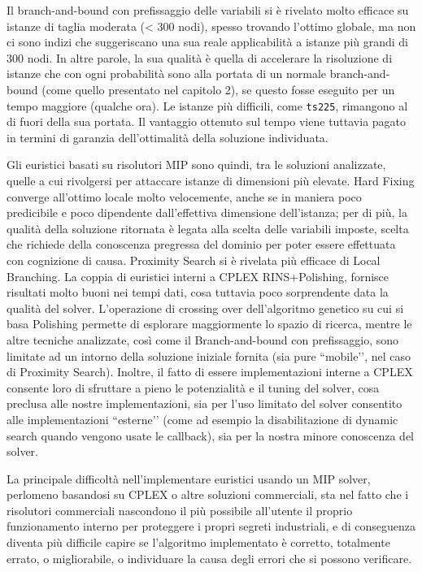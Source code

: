 Il branch-and-bound con prefissaggio delle variabili si è rivelato molto efficace su istanze di taglia moderata (< 300 nodi), spesso trovando l’ottimo globale, ma non ci sono indizi che suggeriscano una sua reale applicabilità a istanze più grandi di 300 nodi. In altre parole, la sua qualità è quella di accelerare la risoluzione di istanze che con ogni probabilità sono alla portata di un normale branch-and-bound (come quello presentato nel capitolo 2), se questo fosse eseguito per un tempo maggiore (qualche ora). Le istanze più difficili, come \texttt{ts225}, rimangono al di fuori della sua portata. Il vantaggio ottenuto sul tempo viene tuttavia pagato in termini di garanzia dell’ottimalità della soluzione individuata.

Gli euristici basati su risolutori MIP sono quindi, tra le soluzioni analizzate, quelle a cui rivolgersi per attaccare istanze di dimensioni più elevate. Hard Fixing converge all’ottimo locale molto velocemente, anche se in maniera poco predicibile e poco dipendente dall’effettiva dimensione dell’istanza; per di più, la qualità della soluzione ritornata è legata alla scelta delle variabili imposte, scelta che richiede della conoscenza pregressa del dominio per poter essere effettuata con cognizione di causa. Proximity Search si è rivelata più efficace di Local Branching. La coppia di euristici interni a CPLEX RINS+Polishing, fornisce risultati molto buoni nei tempi dati, cosa tuttavia poco sorprendente data la qualità del solver. L’operazione di crossing over dell’algoritmo genetico su cui si basa Polishing permette di esplorare maggiormente lo spazio di ricerca, mentre le altre tecniche analizzate, così come il Branch-and-bound con prefissaggio, sono limitate ad un intorno della soluzione iniziale fornita (sia pure ``mobile’’, nel caso di Proximity Search). Inoltre, il fatto di essere implementazioni interne a CPLEX consente loro di sfruttare a pieno le potenzialità e il tuning del solver, cosa preclusa alle nostre implementazioni, sia per l’uso limitato del solver consentito alle implementazioni ``esterne’’ (come ad esempio la disabilitazione di dynamic search quando vengono usate le callback), sia per la nostra minore conoscenza del solver.

La principale difficoltà nell’implementare euristici usando un MIP solver, perlomeno basandosi su CPLEX o altre soluzioni commerciali, sta nel fatto che i risolutori commerciali nascondono il più possibile all’utente il proprio funzionamento interno per proteggere i propri segreti industriali, e di conseguenza diventa più difficile capire se l’algoritmo implementato è corretto, totalmente errato, o migliorabile, o individuare la causa degli errori che si possono verificare.
